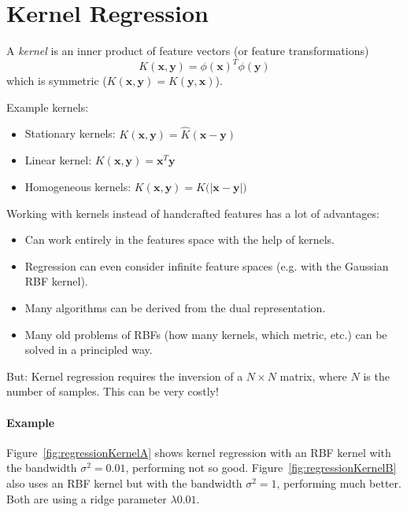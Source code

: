 \documentclass[a4paper, 11pt, accentcolor = tud3b]{tudreport}
\renewcommand{\vec}[1]{\mathbf{#1}}
\begin{document}
		\section{Kernel Regression}
			A \emph{kernel} is an inner product of feature vectors (or feature transformations)
			\begin{equation}
				K(\vec{x}, \vec{y}) = \phi(\vec{x})^T \phi(\vec{y})
			\end{equation}
			which is symmetric (\( K(\vec{x}, \vec{y}) = K(\vec{y}, \vec{x}) \)).
			
			Example kernels:
			\begin{itemize}
				\item Stationary kernels:  \tabto{3cm} \( K(\vec{x}, \vec{y}) = \hat{K}(\vec{x} - \vec{y}) \)
				\item Linear kernel:       \tabto{3cm} \( K(\vec{x}, \vec{y}) = \vec{x}^T \vec{y} \)
				\item Homogeneous kernels: \tabto{3cm} \( K(\vec{x}, \vec{y}) = \hat{K}\big( \lvert \vec{x} - \vec{y} \rvert \big) \)
			\end{itemize}
		
			Working with kernels instead of handcrafted features has a lot of advantages:
			\begin{itemize}
				\item Can work entirely in the features space with the help of kernels.
				\item Regression can even consider infinite feature spaces (e.g. with the Gaussian RBF kernel).
				\item Many algorithms can be derived from the dual representation.
				\item Many old problems of RBFs (how many kernels, which metric, etc.) can be solved in a principled way.
			\end{itemize}
			But: Kernel regression requires the inversion of a \( N \times N \) matrix, where \(N\) is the number of samples. This can be very costly!
			
			\paragraph{Example}
				Figure~\ref{fig:regressionKernelA} shows kernel regression with an RBF kernel with the bandwidth \( \sigma^2 = 0.01 \), performing not so good. Figure~\ref{fig:regressionKernelB} also uses an RBF kernel but with the bandwidth \( \sigma^2 = 1 \), performing much better. Both are using a ridge parameter \( \lambda 0.01 \).
				
\end{document}

